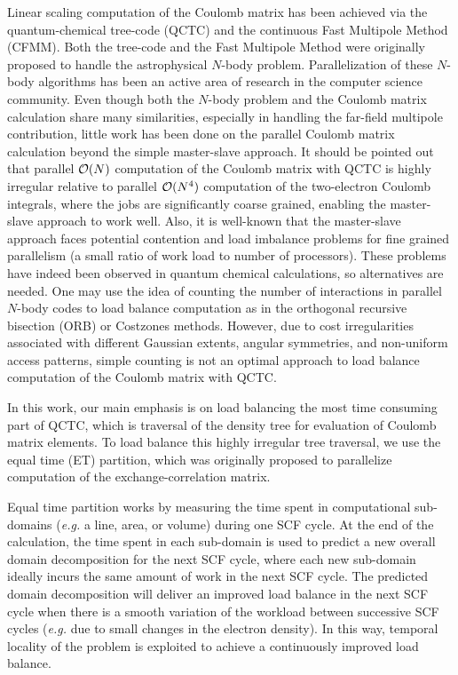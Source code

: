 \commentoutA{\documentclass[prl,aps,twocolumn,twocolumngrid,superbib]{revtex4}}
\begin{document}
Linear scaling computation of the Coulomb matrix has been achieved via
the quantum-chemical tree-code
(QCTC)\cite{MChallacombe96,MChallacombe96B,MChallacombe97} and the
continuous Fast Multipole Method
(CFMM)\cite{CWhite94B,CWhite96A,MStrain96}.  Both the
tree-code\cite{JBarnes86} and the Fast Multipole
Method\cite{LGreengard87,CRAnderson92} were originally proposed to
handle the astrophysical $N$-body problem.  Parallelization of these
$N$-body algorithms has been an active area of research in the
computer science
community\cite{MWarren92,AGrama94,MWarren95b,Singh93,Singh_95v27,YHu96,Grama_98v24,PGibbon02,Antonuccio-Delogu03}.
Even though both the $N$-body problem and the Coulomb matrix
calculation share many similarities, especially in handling the
far-field multipole contribution, little work has been done on the
parallel Coulomb matrix calculation beyond the simple master-slave
approach\cite{Sosa_98v19,Furlani_00v128,Sosa_00v26}.  It should be
pointed out that parallel ${\cal O}(N)$ computation of the Coulomb
matrix with QCTC is highly irregular relative to parallel ${\cal O}(N^4)$
computation of the two-electron Coulomb integrals, where the jobs are
significantly coarse grained, enabling the master-slave approach to
work well.  Also, it is well-known that the master-slave approach faces
potential contention and load imbalance problems for fine grained
parallelism\cite{BWilkinson99} (a small ratio of work load to number
of processors).  These problems have indeed been observed in quantum
chemical calculations\cite{Guerra_95,CGan03}, so alternatives are
needed.  One may use the idea of counting the number of interactions
in parallel $N$-body codes to load balance computation as in the
orthogonal recursive bisection (ORB)\cite{MWarren92} or Costzones
methods\cite{Singh93,Singh_95v27}.  However, due to cost
irregularities associated with different Gaussian extents, angular
symmetries, and non-uniform access patterns, simple counting is not an
optimal approach to load balance computation of the Coulomb matrix with QCTC.

In this work, our main emphasis is on load balancing the most time
consuming part of QCTC, which is traversal of the density tree for
evaluation of Coulomb matrix elements. To load balance this highly
irregular tree traversal, we use the equal time (ET)
partition\cite{CGan03}, which was originally proposed to parallelize
computation of the exchange-correlation matrix.

Equal time partition works by measuring the time spent in
computational sub-domains ({\it e.g.} a line, area, or volume) during
one SCF cycle. At the end of the calculation, the time spent in each
sub-domain is used to predict a new overall domain decomposition for
the next SCF cycle, where each new sub-domain ideally incurs the same
amount of work in the next SCF cycle. The predicted domain
decomposition will deliver an improved load balance in the next SCF
cycle when there is a smooth variation of the workload between
successive SCF cycles ({\it e.g.} due to small changes in the electron
density).  In this way, temporal locality\cite{JPilkington96} of the
problem is exploited to achieve a continuously improved load balance.
\end{document}
